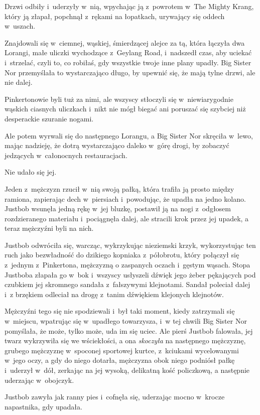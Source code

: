 \documentclass[oneside,polish,11pt,rmheadings]{mwbk}
\begin{document}
Drzwi odbiły i~uderzyły w~nią, wpychając ją z~powrotem w~The Mighty Krang, który ją złapał, popchnął z~rękami na łopatkach, urywający się oddech w~uszach. 


Znajdowali się w~ciemnej, wąskiej, śmierdzącej alejce za tą, która łączyła dwa Lorangi, małe uliczki wychodzące z~Geylang Road, i~nadszedł czas, aby uciekać i~strzelać, czyli to, co robiłaś, gdy wszystkie twoje inne plany upadły. Big Sister Nor przemyślała to wystarczająco długo, by upewnić się, że mają tylne drzwi, ale nie dalej. 


Pinkertonowie byli tuż za nimi, ale wszyscy stłoczyli się w~niewiarygodnie wąskich ciasnych uliczkach i~nikt nie mógł biegać ani poruszać się szybciej niż desperackie szuranie nogami. 


Ale potem wyrwali się do następnego Lorangu, a Big Sister Nor skręciła w~lewo, mając nadzieję, że dotrą wystarczająco daleko w~górę drogi, by zobaczyć jedzących w~całonocnych restauracjach. 


Nie udało się jej. 


Jeden z~mężczyzn rzucił w~nią swoją pałką, która trafiła ją prosto między ramiona, zapierając dech w~piersiach i~powodując, że upadła na jedno kolano. Justbob wsunęła jedną rękę w~jej bluzkę, postawił ją na nogi z~odgłosem rozdzieranego materiału i~pociągnęła dalej, ale stracili krok przez jej upadek, a teraz mężczyźni byli na nich. 


Justbob odwróciła się, warcząc, wykrzykując nieziemski krzyk, wykorzystując ten ruch jako bezwładność do dzikiego kopniaka z~półobrotu, który połączył się z~jednym z~Pinkertona, mężczyzną o zaspanych oczach i~gęstym wąsach. Stopa Justboba złapała go w~bok i~wszyscy usłyszeli dźwięk jego żeber pękających pod czubkiem jej skromnego sandała z~fałszywymi klejnotami. Sandał poleciał dalej i~z brzękiem odleciał na drogę z~tanim dźwiękiem klejonych klejnotów. 


Mężczyźni tego się nie spodziewali i~był taki moment, kiedy zatrzymali się w~miejscu, wpatrując się w~upadłego towarzysza, i~w tej chwili Big Sister Nor pomyślała, że może, tylko może, uda im się uciec. Ale pierś Justbob falowała, jej twarz wykrzywiła się we wściekłości, a ona \textit{skoczyła }na następnego mężczyznę, grubego mężczyznę w~spoconej sportowej kurtce, z~kciukami wycelowanymi w~jego oczy, a gdy do niego dotarła, mężczyzna obok niego podniósł pałkę i~uderzył w~dół, zerkając na jej wysoką, delikatną kość policzkową, a następnie uderzając w~obojczyk. 


Justbob zawyła jak ranny pies i~cofnęła się, uderzając mocno w~krocze napastnika, gdy upadała. 
\end{document}

